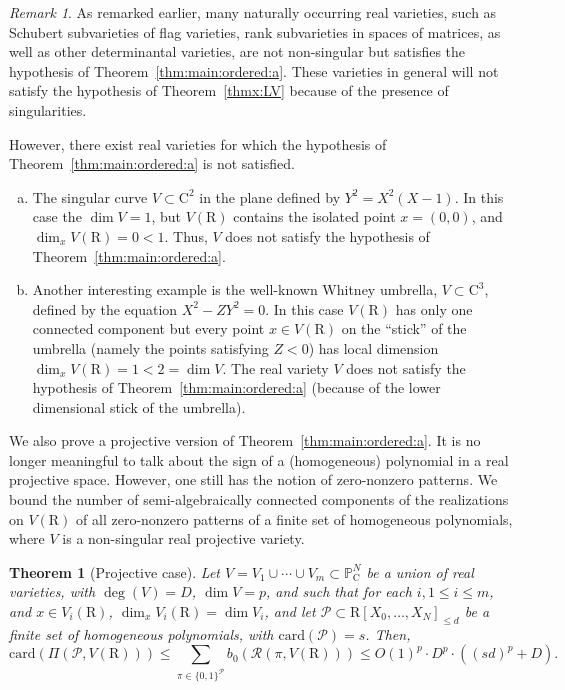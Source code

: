 \documentclass[10pt]{amsart}
\newtheorem{theorem}{Theorem}
\theoremstyle{definition}
\theoremstyle{remark}
\newtheorem{remark}{Remark}
\numberwithin{equation}{section}
\newcommand {\R} {\mathrm{R}}
\newcommand {\C}     {\mathrm{C}}
\newcommand {\RR} {{\mathcal R}}
\newcommand {\PP}     {\mathbb{P}} %
\newcommand{\card}{\mathrm{card}}
\begin{document}
\begin{remark}
As remarked earlier, many naturally occurring real varieties, such as Schubert subvarieties of flag varieties,
    rank subvarieties in spaces of matrices, as well as other determinantal varieties, are not non-singular but satisfies the hypothesis of Theorem~\ref{thm:main:ordered:a}. These varieties in 
    general will not satisfy the hypothesis of Theorem~\ref{thmx:LV} because of the presence of singularities.

However, there exist real varieties for which the hypothesis of
Theorem~\ref{thm:main:ordered:a} is not satisfied.

    \begin{enumerate}[(a)]
        \item The singular curve $V \subset \C^2$ in the plane defined by 
        $Y^2 = X^2(X-1)$. In this case the $\dim V = 1$, but $V(\R)$ contains the isolated point $x = (0,0)$, and $\dim_x V(\R) = 0 < 1$. Thus, $V$ does not satisfy the hypothesis of  Theorem~\ref{thm:main:ordered:a}.
        
        \item 
        Another interesting example
        is the well-known Whitney umbrella, $V \subset \C^3$,  defined by the equation $X^2 - Z Y^2 = 0$. In this case $V(\R)$ has only one connected component but every point $x \in V(\R)$ on the ``stick'' of the umbrella (namely the points satisfying  $Z < 0$) has local dimension $\dim_x V(\R) = 1 < 2 = \dim V$. 
        The real variety $V$ does not satisfy the 
        hypothesis of Theorem~\ref{thm:main:ordered:a} (because of the lower dimensional stick of the umbrella).
    \end{enumerate}
\end{remark}


We also prove a projective version of Theorem~\ref{thm:main:ordered:a}.
It is no longer meaningful to talk about the sign of a (homogeneous)
polynomial in a real projective space. However, one still has the notion of zero-nonzero patterns. We bound the number of semi-algebraically connected components of the realizations on 
$V(\R)$ of all zero-nonzero patterns  of a finite set of homogeneous polynomials, where $V$ is a non-singular real projective variety. 


\begin{theorem}[Projective case] 
 \label{thm:main:ordered:a:projective}
 Let $V = V_1 \cup \cdots \cup V_m \subset \PP_\C^N$ be a union of real varieties, with $\deg(V) = D$, $\dim V = p$, and such that for each $i, 1 \leq i \leq m$, and $x \in V_i(\R)$, 
    $\dim_x V_i(\R) = \dim V_i $,  and let 
    $\mathcal{P} \subset \R[X_0,\ldots,X_N]_{\leq d}$ be a finite set of homogeneous polynomials, with $\card(\mathcal{P}) = s$. Then,
    \[ \card(\Pi(\mathcal{P},V(\R))) \leq
        \sum_{\pi \in \{0,1\}^{\mathcal{P}}} b_0(\RR(\pi,V(\R)))
        \leq 
        O(1)^p \cdot D^p \cdot ((s d)^p + D).
    \]   
\end{theorem}
\end{document}
